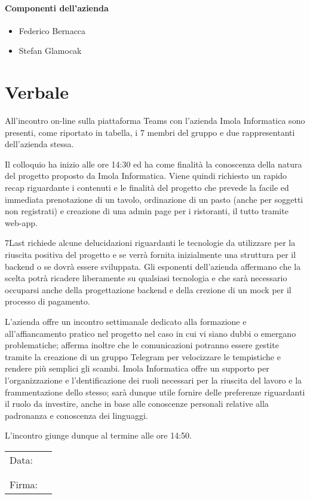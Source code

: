 \documentclass[italian,12pt]{article} %
\begin{document}
\paragraph{Componenti dell'azienda}

\begin{itemize}
	\item Federico Bernacca
	\item Stefan Glamocak
\end{itemize}

\newpage

\section{Verbale}
\begin{flushleft}

	All’incontro on-line sulla piattaforma Teams con l’azienda Imola Informatica sono presenti, 
	come riportato in tabella, i 7 membri del gruppo e due rappresentanti dell’azienda stessa.

	Il colloquio ha inizio alle ore 14:30 ed ha come finalità la conoscenza della natura del progetto proposto da Imola Informatica.
	Viene quindi richiesto un rapido recap riguardante i contenuti e le finalità del progetto che prevede la facile ed immediata 
	prenotazione di un tavolo, ordinazione di un pasto (anche per soggetti non registrati) e creazione di una admin page per i ristoranti, 
	il tutto tramite web-app.
	
	7Last richiede alcune delucidazioni riguardanti le tecnologie da utilizzare per la riuscita positiva del progetto e se verrà fornita 
	inizialmente una struttura per il backend o se dovrà essere sviluppata. Gli esponenti dell’azienda affermano che la scelta potrà 
	ricadere liberamente su qualsiasi tecnologia e che sarà necessario occuparsi anche della progettazione backend e della crezione 
	di un mock per il processo di pagamento.
	
	L’azienda offre un incontro settimanale dedicato alla formazione e all’affiancamento pratico nel progetto nel caso in cui vi 
	siano dubbi o emergano problematiche; afferma inoltre che le comunicazioni potranno essere gestite tramite la creazione di un 
	gruppo Telegram per velocizzare le tempistiche e rendere più semplici gli scambi. Imola Informatica offre un supporto per 
	l’organizzazione e l’dentificazione dei ruoli necessari per la riuscita del lavoro e la frammentazione dello stesso; 
	sarà dunque utile fornire delle preferenze riguardanti il ruolo da investire, anche in base alle conoscenze personali 
	relative alla padronanza e conoscenza dei linguaggi.
	
	L’incontro giunge dunque al termine alle ore 14:50.

\end{flushleft}

\begin{table}[b]
\begin{tabular}{@{}p{.5in}p{4in}@{}}
	Data:  & \hrulefill \\
		   &     		\\
		   &     		\\
	Firma: & \hrulefill \\
\end{tabular}
\end{table}
	
\end{document}
